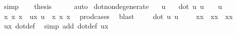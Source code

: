 \begin{isabellebody}
\ simp\isanewline
\ \ \isamarkupfalse%
\ {\isacharquery}{\kern0pt}thesis\ \isamarkupfalse%
\ {}\ {}\ \isamarkupfalse%
\ auto\isanewline
{}\isamarkupfalse%
%
\endisatagproof
{\isafoldproof}%
%
\isadelimproof
\isanewline
%
\endisadelimproof
\isanewline
\isanewline
{}\isamarkupfalse%
\ dot{\isacharunderscore}{\kern0pt}non{\isacharunderscore}{\kern0pt}degenerate{\isacharcolon}{\kern0pt}\isanewline
\ \ \ u\isanewline
\ \ \ {\isachardoublequoteopen}{\isacharparenleft}{\kern0pt}dot\ u\ u\ {\isacharequal}{\kern0pt}\ {}{\isacharparenright}{\kern0pt}\ {\isasymlongleftrightarrow}\ {\isacharparenleft}{\kern0pt}u\ {\isacharequal}{\kern0pt}\ {\isacharparenleft}{\kern0pt}{}{\isacharcomma}{\kern0pt}{}{\isacharcomma}{\kern0pt}{}{\isacharparenright}{\kern0pt}{\isacharparenright}{\kern0pt}{\isachardoublequoteclose}\isanewline
%
\isadelimproof
%
\endisadelimproof
%
\isatagproof
{}\isamarkupfalse%
\ {\isacharminus}{\kern0pt}\isanewline
\ \ \isamarkupfalse%
\ x{}\ x{}\ x{}\ \ ux{\isacharcolon}{\kern0pt}\ {\isachardoublequoteopen}u\ {\isacharequal}{\kern0pt}\ {\isacharparenleft}{\kern0pt}x{}{\isacharcomma}{\kern0pt}\ x{}{\isacharcomma}{\kern0pt}\ x{}{\isacharparenright}{\kern0pt}{\isachardoublequoteclose}\ \isamarkupfalse%
\ prod{\isacharunderscore}{\kern0pt}cases{}\ \isamarkupfalse%
\ blast\isanewline
\ \ \isamarkupfalse%
\ {}{\isacharcolon}{\kern0pt}\ {\isachardoublequoteopen}{\isacharparenleft}{\kern0pt}dot\ u\ u\ {\isacharequal}{\kern0pt}\ {}{\isacharparenright}{\kern0pt}\ \ {\isacharequal}{\kern0pt}\ {\isacharparenleft}{\kern0pt}x{}{\isacharasterisk}{\kern0pt}x{}\ {\isacharplus}{\kern0pt}\ x{}{\isacharasterisk}{\kern0pt}x{}\ {\isacharplus}{\kern0pt}\ x{}{\isacharasterisk}{\kern0pt}x{}\ {\isacharequal}{\kern0pt}\ {}{\isacharparenright}{\kern0pt}{\isachardoublequoteclose}\ \isamarkupfalse%
\ ux\ dot{\isacharunderscore}{\kern0pt}def\ \isamarkupfalse%
\ {\isacharparenleft}{\kern0pt}simp\ add{\isacharcolon}{\kern0pt}\ dot{\isacharunderscore}{\kern0pt}def\ ux{\isacharparenright}{\kern0pt}\isanewline
\ \ \isamarkupfalse%

\end{isabellebody}
